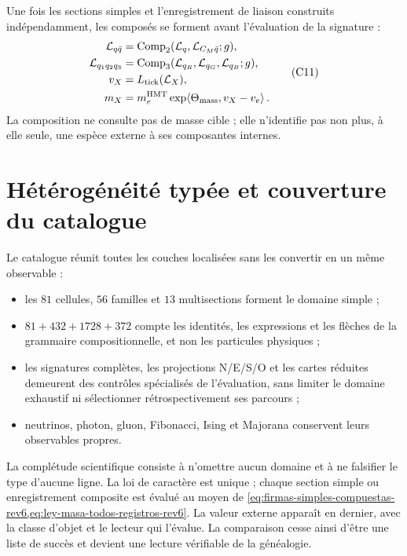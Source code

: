 Une fois les sections simples et l'enregistrement de
liaison construits indépendamment, les composés se forment avant l'évaluation de la signature :
\[
 \begin{aligned}
 \mathcal L_{q\bar q}
   &=\operatorname{Comp}_2
     (\mathcal L_q,\mathcal L_{C_M\bar q};g),\\
 \mathcal L_{q_1q_2q_3}
   &=\operatorname{Comp}_3
     (\mathcal L_{q_R},\mathcal L_{q_G},\mathcal L_{q_B};g),\\
 v_X&=L_{\rm tick}(\mathcal L_X),\\
 m_X&=m_e^{\rm HMT}
   \exp\!\left\langle\Theta_{\rm mass},v_X-v_e\right\rangle.
 \end{aligned}
\tag{C11}\label{eq:reconstruccion-compuesta-masa-rev6}
\]
La composition ne consulte pas de masse cible ; elle n'identifie pas non plus, à elle seule,
une espèce externe à ses composantes internes.

\section{Hétérogénéité typée et couverture du catalogue}

Le catalogue réunit toutes les couches localisées sans les convertir en un même
observable :
\begin{itemize}
\item les \(81\) cellules, \(56\) familles et \(13\) multisections forment le
domaine simple ;
\item \(81+432+1728+372\) compte les identités, les expressions et les flèches de la
grammaire compositionnelle, et non les particules physiques ;
\item les signatures complètes, les projections N/E/S/O et les cartes réduites
      demeurent des contrôles spécialisés de l'évaluation, sans limiter
      le domaine exhaustif ni sélectionner rétrospectivement ses parcours ;
\item neutrinos, photon, gluon, Fibonacci, Ising et Majorana conservent leurs
observables propres.
\end{itemize}

La complétude scientifique consiste à n'omettre aucun domaine et à ne
falsifier le type d'aucune ligne. La loi de caractère est unique ; chaque section
simple ou enregistrement composite est évalué au moyen de
\cref{eq:firmas-simples-compuestas-rev6,eq:ley-masa-todos-registros-rev6}.
La valeur externe apparaît en dernier, avec la classe d'objet et le lecteur qui
l'évalue. La comparaison cesse ainsi d'être une liste de succès et devient
une lecture vérifiable de la généalogie.
